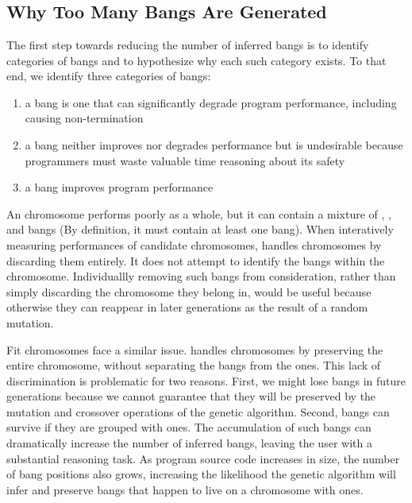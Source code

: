 \chapter{\At{}} 

\label{Chapter3} %


\section{Why Too Many Bangs Are Generated}

The first step towards reducing the number of inferred bangs is to identify
categories of bangs and to hypothesize why each such category exists.
To that end, we identify three categories of bangs:
\begin{enumerate}
  \item{a \textit{\dangerous{}} bang is one that can significantly
degrade program performance, including causing non-termination}
  \item{a \textit{\useless{}} bang neither improves nor degrades
performance but is undesirable because programmers must waste
valuable time reasoning about its safety}
  \item{a \textit{\useful{}} bang improves program performance}
\end{enumerate}

An \unfit{} chromosome performs poorly as a whole, but it can contain
a mixture of \dangerous, \useless{}, and \useful{} bangs (By
definition, it must contain at least one \dangerous{} bang).
When interatively measuring performances of candidate chromosomes,
\Ao{} handles \unfit{} chromosomes by discarding them entirely.
It does not attempt to identify the \dangerous{} bangs within the chromosome. 
Individuallly removing such bangs from consideration, rather than simply discarding 
the chromosome they belong in, would
be useful because otherwise they can reappear in later generations as
the result of a random mutation.

Fit chromosomes face a similar issue. \Ao{} handles \fit{} chromosomes
by preserving the entire chromosome, without separating the \useful{}
bangs from the \useless{} ones. This lack of discrimination is
problematic for two reasons. First, we might lose \useful{} bangs in
future generations because we cannot guarantee that they will be
preserved by the mutation and crossover operations of the genetic
algorithm. Second, \useless{} bangs can survive if they are grouped
with \useful{} ones. The accumulation of such \useless{} bangs
can dramatically increase the number of inferred bangs, leaving the
user with a substantial reasoning task. As program source code
increases in size, the number of \useless{} bang positions also grows,
increasing the likelihood the genetic algorithm will infer and
preserve \useless{} bangs that happen to live on a chromosome
with \useful{} ones.

